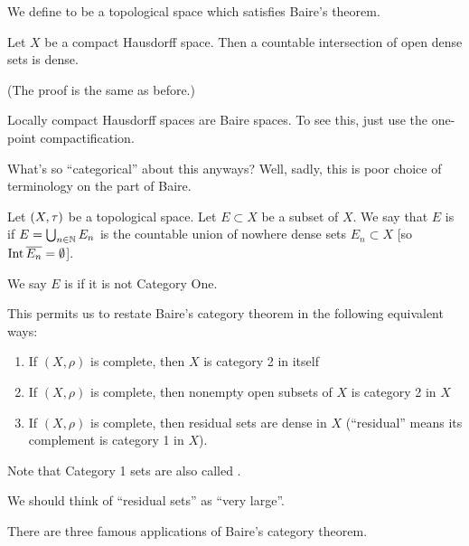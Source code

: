 \begin{definition}
We define  to be a topological space which
satisfies Baire's theorem.
\end{definition}

\begin{theorem}
Let $X$ be a compact Hausdorff space. Then a countable intersection of
open dense sets is dense.
\end{theorem}

(The proof is the same as before.)

\begin{remark}
Locally compact Hausdorff spaces are Baire spaces. To see this, just
use the one-point compactification.
\end{remark}

\begin{remark}[Terminology]
What's so ``categorical'' about this anyways? Well, sadly, this is
poor choice of terminology on the part of Baire.

Let $(X,\tau)$ be a topological space. Let $E\subset X$ be a
subset of $X$. We say that $E$ is  if
$E=\bigcup_{n\in\mathbb{N}}E_{n}$ is the countable union of nowhere dense
sets $E_{n}\subset X$ [so $\operatorname{Int}{\overline{E_{n}}}=\emptyset$].

We say $E$ is  if it is not Category One.

This permits us to restate Baire's category theorem in the following
equivalent ways:
\begin{enumerate}
\item If $(X,\rho)$ is complete, then $X$ is category 2 in itself
\item If $(X,\rho)$ is complete, then nonempty open subsets of $X$ is category 2 in $X$
\item If $(X,\rho)$ is complete, then residual sets are dense in $X$
  (``residual'' means its complement is category 1 in $X$).
\end{enumerate}
Note that Category 1 sets are also called .
\end{remark}

\begin{node}
We should think of ``residual sets'' as ``very large''.
\end{node}

There are three famous applications of Baire's category theorem.


